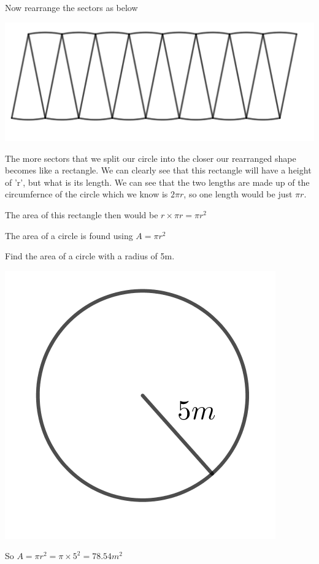 \bigskip

Now rearrange the sectors as below

\bigskip

\includegraphics{./Images/Measurement/Circle2Rec.png}

The more sectors that we split our circle into the closer our rearranged shape becomes like a rectangle.  We can clearly see that this rectangle will have a height of 'r', but what is its length.  We can see that the two lengths are made up of the circumfernce of the circle which we know is $2 \pi r$, so one length would be just $\pi r$.

The area of this rectangle then would be $r \times \pi r = \pi r^2$

\bigskip

The area of a circle is found using $A=\pi r^2$

\begin{exmp}
Find the area of a circle with a radius of 5m.

\bigskip

\includegraphics{./Images/Measurement/CircleAreaEg1.png}

\bigskip

So $A = \pi r^2 = \pi \times 5^2 = 78.54 m^2$


\end{exmp}


